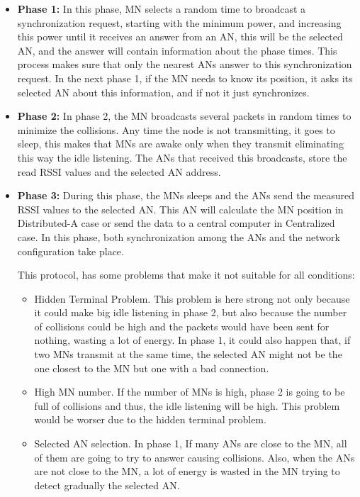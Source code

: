 \begin{itemize}
 \item \textbf{Phase 1:} In this phase, \ac{MN} selects a random time to broadcast a synchronization request, starting with the minimum power,
and increasing this power until it receives an answer from an \ac{AN}, this will be the selected \ac{AN}, and the answer will contain information
about the phase times. This process makes sure that only the nearest \acp{AN} answer to this synchronization request. In the next phase 1, if 
the \ac{MN} needs to know its position, it asks its selected \ac{AN} about this information, and if not it just synchronizes.
 \item \textbf{Phase 2:} In phase 2, the \ac{MN} broadcasts several packets in random times to minimize the collisions. Any time the node is not
transmitting, it goes to sleep, this makes that \acp{MN} are awake only when they transmit eliminating this way the idle listening. The \acp{AN} that
received this broadcasts, store the read \ac{RSSI} values and the selected \ac{AN} address.
 \item \textbf{Phase 3:} During this phase, the \acp{MN} sleeps and the \acp{AN} send the measured \ac{RSSI} values to the selected \ac{AN}. 
This \ac{AN} will calculate the \ac{MN} position in Distributed-A case or send the data to a central computer in Centralized case. In this phase, both 
synchronization among the \acp{AN} and the network configuration take place.

This protocol, has some problems that make it not suitable for all conditions:

\begin{itemize}
 \item Hidden Terminal Problem. This problem is here strong not only because it could make big idle listening in phase 2, but also because the number
of collisions could be high and the packets would have been sent for nothing, wasting a lot of energy. In phase 1, it could also 
happen that, if two \acp{MN} transmit at the same time, the selected \ac{AN} might not be the one closest to the \ac{MN} but one with a bad connection.
 \item High \ac{MN} number. If the number of \acp{MN} is high, phase 2 is going to be full of collisions and thus, the idle listening will be
high. This problem would be worser due to the hidden terminal problem.
 \item Selected \ac{AN} selection. In phase 1, If many \acp{AN} are close to the \ac{MN}, all of them are going to try to answer causing collisions. Also, 
when the \acp{AN} are not close to the \ac{MN}, a lot of energy is wasted in the \ac{MN} trying to detect gradually the selected \ac{AN}.
\end{itemize}


\end{itemize}


